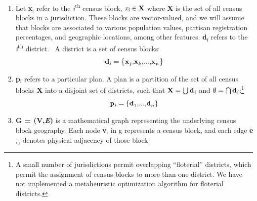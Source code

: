 \documentclass[article]{JSSstyle/jss}
\newcommand\textsubscript[1]{\ensuremath{{}_{\text{#1}}}}
\begin{document}
\begin{enumerate}
\item Let \textbf{x}\textit{\textsubscript{i}} refer to the
\textit{i}\textsuperscript{th} census block, $\textit{x}\textit{\textsubscript{i}}\in{\textbf{X}}$ 
where \textbf{X} is the set of all census blocks in a jurisdiction. These blocks are
vector{}-valued, and we will assume that blocks are associated to various
population values, partisan registration percentages, and geographic
locations, among other features.
\textbf{d}\textit{\textsubscript{i}} refers to the
\textit{i}\textsuperscript{th} district. \ A district is a set of
census blocks: %
\[
{\bf d}_i  = \left\{ {{\bf x}_j^{} {\rm ,}{\bf x}_k^{} {\rm ,}...{\rm ,}{\bf x}_n^{} } \right\}
\]
\item 
\textbf{p}\textit{\textsubscript{i}} refers to a particular plan. A plan
is a partition of the set of all census blocks \textbf{X} into a disjoint set of districts, such that $\textbf{X}=\bigcup{\textbf{d}\textit{\textsubscript{i}}}$ and $\emptyset=\bigcap{\textbf{d}\textit{\textsubscript{i}}}$:\footnote{A small number of jurisdictions permit 
overlapping ``floterial'' districts, which permit the assignment of census blocks to more than one district.  We have not implemented a metaheuristic
optimization algorithm for floterial districts.}
\[
{\bf p}_i  = \left\{ {{\bf d}_1^{} {\rm ,}...{\rm ,}{\bf d}_n^{} } \right\}
\]
\item 
\textbf{G = (V,}\textbf{\textit{E}}\textbf{)} \textmd{is a mathematical
graph representing the underlying census block geography. Each} node
\textbf{v}\textit{\textsubscript{i}} in g represents a census block,
and each edge \textbf{e}\textit{\textsubscript{i,j}} denotes physical
adjacency of those block
\end{enumerate}
\end{document}
